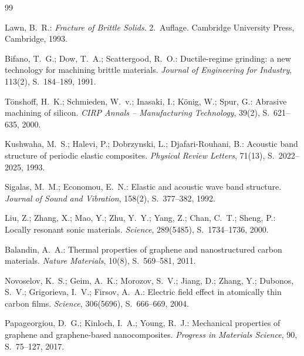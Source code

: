 ﻿\documentclass[a4paper,12pt]{article}
\theoremstyle{definition}
\begin{document}
\begin{thebibliography}{99}
 
Lawn, B.~R.:
\textit{Fracture of Brittle Solids}.
2.~Auflage. Cambridge University Press, Cambridge, 1993.
 
Bifano, T.~G.; Dow, T.~A.; Scattergood, R.~O.:
Ductile-regime grinding: a new technology for machining brittle materials.
\textit{Journal of Engineering for Industry}, 113(2), S.~184--189, 1991.
 
T{\"o}nshoff, H.~K.; Schmieden, W.~v.; Inasaki, I.; K{\"o}nig, W.; Spur, G.:
Abrasive machining of silicon.
\textit{CIRP Annals -- Manufacturing Technology}, 39(2), S.~621--635, 2000.
 
 
Kushwaha, M.~S.; Halevi, P.; Dobrzynski, L.; Djafari-Rouhani, B.:
Acoustic band structure of periodic elastic composites.
\textit{Physical Review Letters}, 71(13), S.~2022--2025, 1993.
 
Sigalas, M.~M.; Economou, E.~N.:
Elastic and acoustic wave band structure.
\textit{Journal of Sound and Vibration}, 158(2), S.~377--382, 1992.
 
Liu, Z.; Zhang, X.; Mao, Y.; Zhu, Y.~Y.; Yang, Z.; Chan, C.~T.; Sheng, P.:
Locally resonant sonic materials.
\textit{Science}, 289(5485), S.~1734--1736, 2000.
 
 
Balandin, A.~A.:
Thermal properties of graphene and nanostructured carbon materials.
\textit{Nature Materials}, 10(8), S.~569--581, 2011.
 
Novoselov, K.~S.; Geim, A.~K.; Morozov, S.~V.; Jiang, D.; Zhang, Y.;
Dubonos, S.~V.; Grigorieva, I.~V.; Firsov, A.~A.:
Electric field effect in atomically thin carbon films.
\textit{Science}, 306(5696), S.~666--669, 2004.
 
Papageorgiou, D.~G.; Kinloch, I.~A.; Young, R.~J.:
Mechanical properties of graphene and graphene-based nanocomposites.
\textit{Progress in Materials Science}, 90, S.~75--127, 2017.
 

\end{thebibliography}
\end{document}
